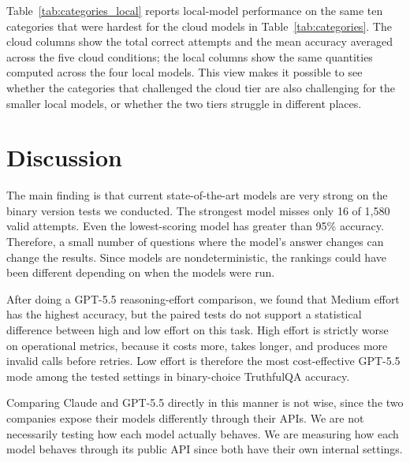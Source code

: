 \documentclass[11pt]{article}
\begin{document}
Table~\ref{tab:categories_local} reports local-model performance on the same
ten categories that were hardest for the cloud models in
Table~\ref{tab:categories}. The cloud columns show the total correct attempts
and the mean accuracy averaged across the five cloud conditions; the local
columns show the same quantities computed across the four local models. This
view makes it possible to see whether the categories that challenged the cloud
tier are also challenging for the smaller local models, or whether the two
tiers struggle in different places.
\begin{table}[t]
\centering
\small
{}
\caption{Local vs.\ cloud accuracy on the cloud-hardest categories.}
\label{tab:categories_local}
\end{table}

\section{Discussion}
The main finding is that current state-of-the-art models are very strong on
 the binary version tests we conducted. The strongest model misses only 16
of 1,580 valid attempts. Even the lowest-scoring model has greater than 95\%
accuracy. Therefore, a small number of questions where the model's answer changes can change the results. Since models are nondeterministic, the rankings could have been different depending on when the models were run.

After doing a GPT-5.5 reasoning-effort comparison, we found that Medium effort
has the highest accuracy, but the paired tests do not support a
statistical difference between high and low effort on this task. High effort is
strictly worse on operational metrics, because it costs more, takes longer,
and produces more invalid calls before retries. Low effort is therefore the most
cost-effective GPT-5.5 mode among the tested settings in binary-choice TruthfulQA accuracy.

Comparing Claude and GPT-5.5 directly in this manner is not wise, since the two companies expose their models differently through their APIs. We are not necessarily testing how each model actually behaves. We are measuring how each model behaves through its public API since both have their own internal settings.
\end{document}
